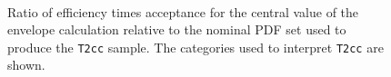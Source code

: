 \begin{figure}[h!]
  \begin{center}
    \\
    \caption{\label{fig:sms-pdf-t2cc}Ratio of efficiency times
      acceptance for the central value of the envelope calculation relative 
      to the nominal PDF set used to produce the \texttt{T2cc} sample. The categories
      used to interpret \texttt{T2cc} are shown.}
  \end{center}
\end{figure}


